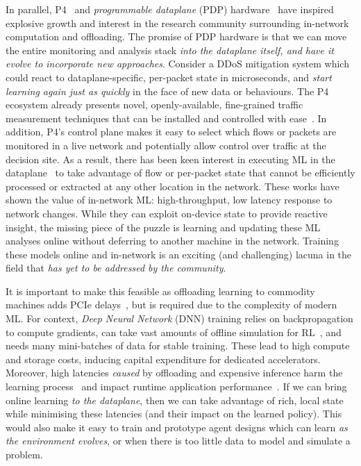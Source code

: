 \documentclass[
conference
,10pt
]{IEEEtran}
\begin{document}
In parallel, P4~\parencite{DBLP:journals/ccr/BosshartDGIMRSTVVW14} and \emph{programmable dataplane} (PDP) hardware~\parencite{DBLP:journals/micro/ZilbermanACM14, netronome-smartnic, xilinx-alveo, barefoot-intel} have inspired explosive growth and interest in the research community surrounding in-network computation and offloading.
The promise of PDP hardware is that we can move the entire monitoring and analysis stack \emph{into the dataplane itself, and have it evolve to incorporate new approaches}.
Consider a DDoS mitigation system which could react to dataplane-specific, per-packet state in microseconds, and \emph{start learning again just as quickly} in the face of new data or behaviours.
The P4 ecosystem already presents novel, openly-available, fine-grained traffic measurement techniques that can be installed and controlled with ease~\parencite{DBLP:conf/sigcomm/GuptaHCFRW18,DBLP:conf/sigcomm/ChenFKRR18,DBLP:conf/sosr/GhasemiBR17}.
In addition, P4's control plane makes it easy to select which flows or packets are monitored in a live network and potentially allow control over traffic at the decision site.
As a result, there has been keen interest in executing ML in the dataplane~\parencite{DBLP:conf/hotnets/XiongZ19,DBLP:conf/sigcomm/SanvitoSB18,DBLP:journals/corr/abs-1801-05731,DBLP:journals/corr/abs-2009-02353,langlet-ml-netronome,DBLP:journals/corr/abs-2002-08987} to take advantage of flow or per-packet state that cannot be efficiently processed or extracted at any other location in the network.
These works have shown the value of in-network ML: high-throughput, low latency response to network changes.
While they can exploit on-device state to provide reactive insight, the missing piece of the puzzle is learning and updating these ML analyses online without deferring to another machine in the network.
Training these models online and in-network is an exciting (and challenging) lacuna in the field that \emph{has yet to be addressed by the community}.

It is important to make this feasible as offloading learning to commodity machines adds PCIe delays~\parencite{DBLP:journals/corr/abs-2009-02353,DBLP:conf/sigcomm/NeugebauerAZAL018}, but is required due to the complexity of modern ML.
For context, \emph{Deep Neural Network} (DNN) training relies on backpropagation to compute gradients, can take vast amounts of offline simulation for RL~\parencite{DBLP:journals/corr/abs-1912-06680}, and needs many mini-batches of data for stable training.
These lead to high compute and storage costs, inducing capital expenditure for dedicated accelerators.
Moreover, high latencies \emph{caused} by offloading and expensive inference harm the learning process~\parencite{DBLP:journals/firai/TravnikMSP18} and impact runtime application performance~\parencite{DBLP:journals/corr/abs-1910-04054}.
If we can bring online learning \emph{to the dataplane}, then we can take advantage of rich, local state while minimising these latencies (and their impact on the learned policy).
This would also make it easy to train and prototype agent designs which can learn \emph{as the environment evolves}, or when there is too little data to model and simulate a problem.
\end{document}
